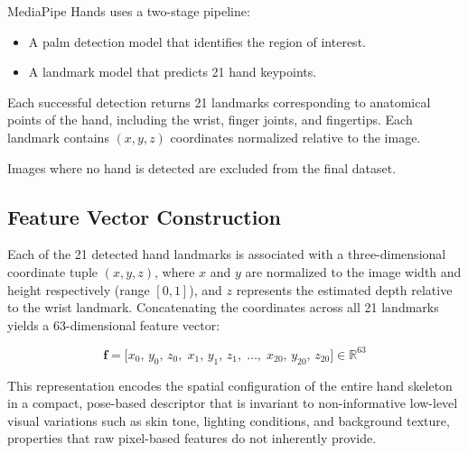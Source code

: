 MediaPipe Hands uses a two-stage pipeline:

\begin{itemize}
\item A palm detection model that identifies the region of interest.
\item A landmark model that predicts 21 hand keypoints.
\end{itemize}

Each successful detection returns 21 landmarks corresponding to anatomical points of the hand, including the wrist, finger joints, and fingertips. Each landmark contains $(x, y, z)$ coordinates normalized relative to the image.

Images where no hand is detected are excluded from the final dataset.

\subsection{Feature Vector Construction}

Each of the 21 detected hand landmarks is associated with a three-dimensional coordinate tuple $(x, y, z)$, where $x$ and $y$ are normalized to the image width and height respectively (range $[0, 1]$), and $z$ represents the estimated depth relative to the wrist landmark. Concatenating the coordinates across all 21 landmarks yields a 63-dimensional feature vector:

\begin{equation}
  \mathbf{f} = \bigl[x_0,\, y_0,\, z_0,\; x_1,\, y_1,\, z_1,\; \ldots,\; x_{20},\, y_{20},\, z_{20}\bigr] \in \mathbb{R}^{63}
\end{equation}

This representation encodes the spatial configuration of the entire hand skeleton in a compact, pose-based descriptor that is invariant to non-informative low-level visual variations such as skin tone, lighting conditions, and background texture, properties that raw pixel-based features do not inherently provide.

